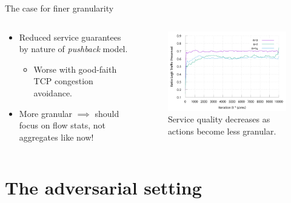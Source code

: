 \documentclass[aspectratio=169,xcolor={dvipsnames}
,hide notes
]{beamer}
\begin{document}
\begin{frame}{The case for finer granularity}
	\begin{columns}
	\begin{column}{0.45\linewidth}
		\begin{itemize}
			\item Reduced service guarantees by nature of \emph{pushback} model.
			\begin{itemize}
				\item \alert{Worse with good-faith TCP congestion avoidance}.
			\end{itemize}
			
			\item More granular $\implies$ should focus on flow stats, \alert{not aggregates} like now! %
		\end{itemize}
	\end{column}
	\begin{column}{0.5\linewidth}
		\begin{figure}
			\includegraphics[width=\linewidth]{../plots/online.pdf}
			\caption{Service quality decreases as actions become less granular.}
		\end{figure}
	\end{column}
	\end{columns}
\end{frame}

\section{The adversarial setting}
\end{document}
